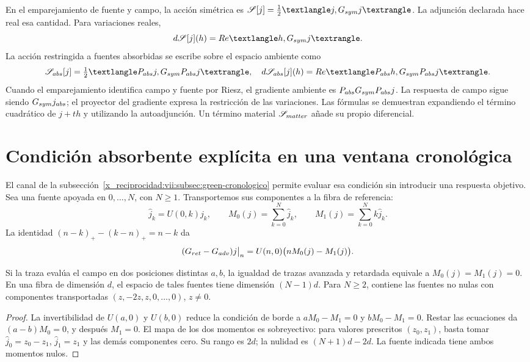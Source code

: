 En el emparejamiento de fuente y campo, la acción simétrica es
\(\mathscr S[j]=\tfrac12\langle j,G_{\rm sym}j\rangle\).
La adjunción declarada hace real esa cantidad. Para variaciones reales,
\[
 \mathrm d\mathscr S[j](h)
 =\operatorname{Re}\langle h,G_{\rm sym}j\rangle.
\]
La acción restringida a fuentes absorbidas se escribe sobre el espacio
ambiente como
\begin{equation}
 \mathscr S_{\rm abs}[j]
 =\tfrac12\langle P_{\rm abs}j,G_{\rm sym}P_{\rm abs}j\rangle,
 \quad
 \mathrm d\mathscr S_{\rm abs}[j](h)
 =\operatorname{Re}\langle P_{\rm abs}h,G_{\rm sym}P_{\rm abs}j\rangle.
 \label{x_reciprocidad:vii:eq:variacion-restringida-absorcion}
\end{equation}
Cuando el emparejamiento identifica campo y fuente por Riesz, el gradiente
ambiente es \(P_{\rm abs}G_{\rm sym}P_{\rm abs}j\).
La respuesta de campo sigue siendo \(G_{\rm sym}j_{\rm abs}\); el
proyector del gradiente expresa la restricción de las variaciones.
Las fórmulas se demuestran expandiendo el término cuadrático de
\(j+th\) y utilizando la autoadjunción. Un término material
\(\mathscr S_{\rm matter}\) añade su propio diferencial.

\section{Condición absorbente explícita en una ventana cronológica}
\label{x_reciprocidad:vii:subsec:absorcion-momentos}

El canal de la subsección~\ref{x_reciprocidad:vii:subsec:green-cronologico} permite
evaluar esa condición sin introducir una respuesta objetivo. Sea una
fuente apoyada en \(0,\ldots,N\), con \(N\geq1\). Transportemos
sus componentes a la fibra de referencia:
\[
 \widehat j_k=U(0,k)j_k,\qquad
 M_0(j)=\sum_{k=0}^N\widehat j_k,\qquad
 M_1(j)=\sum_{k=0}^Nk\widehat j_k.
\]
La identidad \((n-k)_+-(k-n)_+=n-k\) da
\begin{equation}
 (G_{\rm ret}-G_{\rm adv})j\big|_n
 =U(n,0)\bigl(nM_0(j)-M_1(j)\bigr).
 \label{x_reciprocidad:vii:eq:diferencia-green-momentos}
\end{equation}

\begin{proposition}
\label{x_reciprocidad:vii:prop:absorcion-momentos}
Si la traza evalúa el campo en dos posiciones distintas \(a,b\),
la igualdad de trazas avanzada y retardada equivale a
\(M_0(j)=M_1(j)=0\). En una fibra de dimensión \(d\), el espacio
de tales fuentes tiene dimensión \((N-1)d\). Para \(N\geq2\),
contiene las fuentes no nulas con componentes transportadas
\((z,-2z,z,0,\ldots,0)\), \(z\neq0\).
\end{proposition}
\begin{proof}
La invertibilidad de \(U(a,0)\) y \(U(b,0)\) reduce la condición
de borde a \(aM_0-M_1=0\) y \(bM_0-M_1=0\).
Restar las ecuaciones da \((a-b)M_0=0\), y después \(M_1=0\).
El mapa de los dos momentos es sobreyectivo: para valores prescritos
\((z_0,z_1)\), basta tomar
\(\widehat j_0=z_0-z_1\), \(\widehat j_1=z_1\) y las demás
componentes cero. Su rango es \(2d\); la nulidad es
\((N+1)d-2d\). La fuente indicada tiene ambos momentos nulos.
\end{proof}

